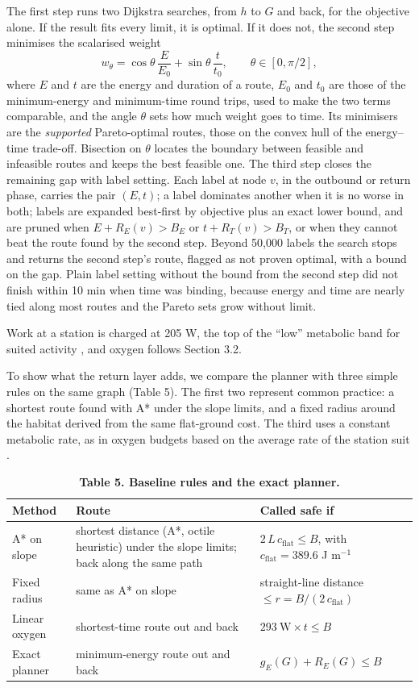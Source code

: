 \documentclass[11pt,a4paper]{article}
\begin{document}
The first step runs two Dijkstra searches, from $h$ to $G$ and back, for the objective alone. If the result fits every limit, it is optimal. If it does not, the second step minimises the scalarised weight \[w_\theta = \cos\theta\,\frac{E}{E_0} + \sin\theta\,\frac{t}{t_0},\qquad \theta \in [0, \pi/2],\] where $E$ and $t$ are the energy and duration of a route, $E_0$ and $t_0$ are those of the minimum-energy and minimum-time round trips, used to make the two terms comparable, and the angle $\theta$ sets how much weight goes to time. Its minimisers are the \emph{supported} Pareto-optimal routes, those on the convex hull of the energy--time trade-off. Bisection on $\theta$ locates the boundary between feasible and infeasible routes and keeps the best feasible one. The third step closes the remaining gap with label setting. Each label at node $v$, in the outbound or return phase, carries the pair $(E, t)$; a label dominates another when it is no worse in both; labels are expanded best-first by objective plus an exact lower bound, and are pruned when $E + R_E(v) > B_E$ or $t + R_T(v) > B_T$, or when they cannot beat the route found by the second step. Beyond 50,000 labels the search stops and returns the second step's route, flagged as not proven optimal, with a bound on the gap. Plain label setting without the bound from the second step did not finish within 10 min when time was binding, because energy and time are nearly tied along most routes and the Pareto sets grow without limit.

Work at a station is charged at 205 W, the top of the ``low'' metabolic band for suited activity \cite{NASA-xEMU-met}, and oxygen follows Section 3.2.

To show what the return layer adds, we compare the planner with three simple rules on the same graph (Table 5). The first two represent common practice: a shortest route found with A* under the slope limits, and a fixed radius around the habitat derived from the same flat-ground cost. The third uses a constant metabolic rate, as in oxygen budgets based on the average rate of the station suit \cite{NASA-Mars-mass}.

\begin{table}[H]
\centering\small
\caption{\textbf{Table 5. Baseline rules and the exact planner.}}
\begin{tabular}{lll}
\toprule
Method & Route & Called safe if \\
\midrule
A* on slope & shortest distance (A*, octile heuristic) under the slope limits; back along the same path & $2\,L\,c_\text{flat} \le B$, with $c_\text{flat} = 389.6$ J m$^{-1}$ \\
Fixed radius & same as A* on slope & straight-line distance $\le r = B / (2\,c_\text{flat})$ \\
Linear oxygen & shortest-time route out and back & $293\ \text{W} \times t \le B$ \\
Exact planner & minimum-energy route out and back & $g_E(G) + R_E(G) \le B$ \\
\bottomrule
\end{tabular}
\end{table}
\end{document}
